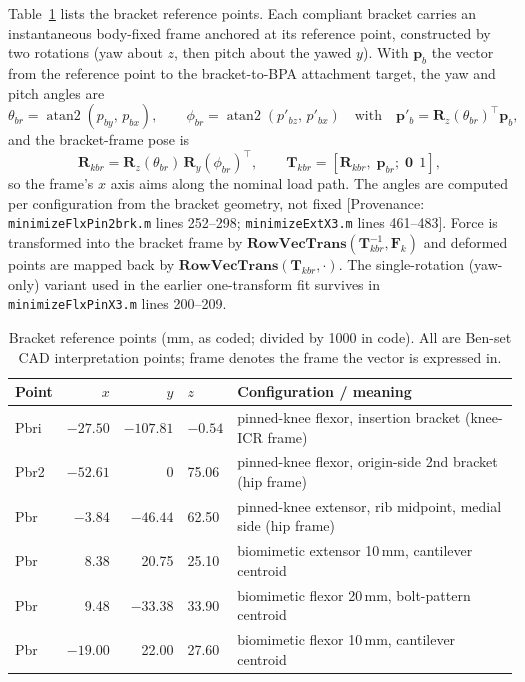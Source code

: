 Table~\ref{tab:app_bracket_points} lists the bracket reference points. Each compliant bracket carries an instantaneous body-fixed frame anchored at its reference point, constructed by two rotations (yaw about $z$, then pitch about the yawed $y$). With $\mathbf{p}_{b}$ the vector from the reference point to the bracket-to-BPA attachment target, the yaw and pitch angles are
\begin{equation}
    \theta_{br} = \operatorname{atan2}(p_{by},\, p_{bx}),
    \qquad
    \phi_{br} = \operatorname{atan2}(p'_{bz},\, p'_{bx})
    \quad\text{with}\quad
    \mathbf{p}'_{b} = \mathbf{R}_{z}(\theta_{br})^{\top}\mathbf{p}_{b},
    \label{eq:app_bracketangles}
\end{equation}
and the bracket-frame pose is
\begin{equation}
    \mathbf{R}_{kbr} = \mathbf{R}_{z}(\theta_{br})\,\mathbf{R}_{y}(\phi_{br})^{\top},
    \qquad
    \mathbf{T}_{kbr} = \left[\mathbf{R}_{kbr},\; \mathbf{p}_{br};\; \mathbf{0}\;\,1\right],
    \label{eq:app_bracketframe}
\end{equation}
so the frame's $x$ axis aims along the nominal load path. The angles are computed per configuration from the bracket geometry, not fixed [Provenance: \texttt{minimizeFlxPin2brk.m} lines 252--298; \texttt{minimizeExtX3.m} lines 461--483]. Force is transformed into the bracket frame by $\mathbf{RowVecTrans}(\mathbf{T}_{kbr}^{-1}, \mathbf{F}_{k})$ and deformed points are mapped back by $\mathbf{RowVecTrans}(\mathbf{T}_{kbr}, \cdot)$. The single-rotation (yaw-only) variant used in the earlier one-transform fit survives in \texttt{minimizeFlxPinX3.m} lines 200--209.

\begin{table}[htbp]
\caption{Bracket reference points (mm, as coded; divided by 1000 in code). All are Ben-set CAD interpretation points; frame denotes the frame the vector is expressed in.}
\label{tab:app_bracket_points}
\begin{tabular}{@{}lrrll@{}}
\toprule
\textbf{Point} & $x$ & $y$ & $z$ & \textbf{Configuration / meaning} \\
\midrule
Pbri & $-27.50$ & $-107.81$ & $-0.54$ & pinned-knee flexor, insertion bracket (knee-ICR frame) \\
Pbr2 & $-52.61$ & 0 & 75.06 & pinned-knee flexor, origin-side 2nd bracket (hip frame) \\
Pbr  & $-3.84$  & $-46.44$ & 62.50 & pinned-knee extensor, rib midpoint, medial side (hip frame) \\
Pbr  & 8.38 & 20.75 & 25.10 & biomimetic extensor 10\,mm, cantilever centroid \\
Pbr  & 9.48 & $-33.38$ & 33.90 & biomimetic flexor 20\,mm, bolt-pattern centroid \\
Pbr  & $-19.00$ & 22.00 & 27.60 & biomimetic flexor 10\,mm, cantilever centroid \\
\bottomrule
\end{tabular}
\end{table}

